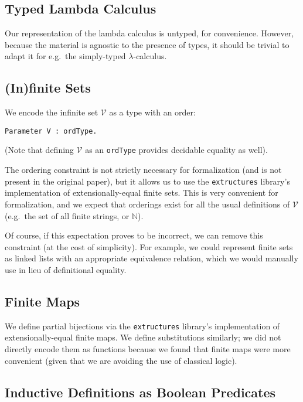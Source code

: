 \documentclass{article}
\begin{document}
\subsection{Typed Lambda Calculus}

Our representation of the lambda calculus is untyped, for convenience. However, because the material
is agnostic to the presence of types, it should be trivial to adapt it for e.g.\ the simply-typed
$\lambda$-calculus.

\subsection{(In)finite Sets}

We encode the infinite set $\mathcal{V}$ as a type with an order:

\begin{verbatim}
Parameter V : ordType.
\end{verbatim}

(Note that defining $\mathcal{V}$ as an \verb|ordType| provides decidable equality as well).

The ordering constraint is not strictly necessary for formalization (and is not present in the
original paper), but it allows us to use the \verb|extructures| library's implementation of
extensionally-equal finite sets. This is very convenient for formalization, and we expect that
orderings exist for all the usual definitions of $\mathcal{V}$ (e.g.\ the set of all finite strings,
or $\mathbb{N}$).

Of course, if this expectation proves to be incorrect, we can remove this constraint (at the cost of
simplicity). For example, we could represent finite sets as linked lists with an appropriate
equivalence relation, which we would manually use in lieu of definitional equality.

\subsection{Finite Maps}

We define partial bijections via the \verb|extructures| library's implementation of
extensionally-equal finite maps. We define substitutions similarly; we did not directly encode them
as functions because we found that finite maps were more convenient (given that we are avoiding the
use of classical logic).

\subsection{Inductive Definitions as Boolean Predicates}
\end{document}
